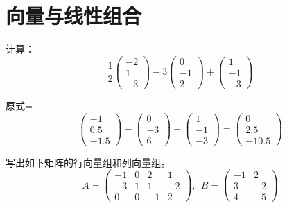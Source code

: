 \documentclass[a4paper]{report}
\begin{document}
\section{向量与线性组合}
\EX 计算：
\begin{equation*}
\frac{1}{2}
\begin{pmatrix}
-2\\ 1\\ -3
\end{pmatrix}-3
\begin{pmatrix}
0\\ -1\\ 2
\end{pmatrix}+
\begin{pmatrix}
1\\ -1\\ -3
\end{pmatrix}
\end{equation*}

\begin{jie}
原式=
\begin{equation*}
\begin{pmatrix}
-1\\ 0.5\\ -1.5
\end{pmatrix}-
\begin{pmatrix}
0\\ -3\\ 6
\end{pmatrix}+
\begin{pmatrix}
1\\ -1\\ -3
\end{pmatrix}=\begin{pmatrix}
0\\ 2.5\\ -10.5
\end{pmatrix}
\end{equation*}
\end{jie}

\EX 写出如下矩阵的行向量组和列向量组。
\begin{equation*}
A=
\begin{pmatrix}
-1 &0&2&1\\ -3& 1&1&-2\\ 0&0&-1&2
\end{pmatrix},~~B=
\begin{pmatrix}
-1&2\\ 3&-2\\ 4&-5
\end{pmatrix}
\end{equation*}
\end{document}
